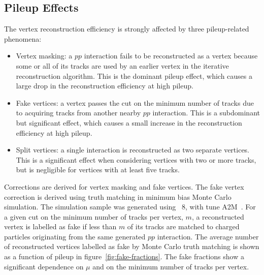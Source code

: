 \subsection{Pileup Effects}\label{sec:luminosity-vertex-pileup}
The vertex reconstruction efficiency is strongly affected by three pileup-related phenomena:

\begin{itemize}
	\item Vertex masking: a $pp$ interaction fails to be reconstructed as a vertex because some or all of its tracks are used by an earlier vertex in the iterative reconstruction algorithm. This is the dominant pileup effect, which causes a large drop in the reconstruction efficiency at high pileup.
	\item Fake vertices: a vertex passes the cut on the minimum number of tracks due to acquiring tracks from another nearby $pp$ interaction. This is a subdominant but significant effect, which causes a small increase in the reconstruction efficiency at high pileup.
	\item Split vertices: a single interaction is reconstructed as two separate vertices. This is a significant effect when considering vertices with two or more tracks, but is negligible for vertices with at least five tracks.
\end{itemize}

Corrections are derived for vertex masking and fake vertices. The fake vertex correction is derived using truth matching in minimum bias Monte Carlo simulation. The simulation sample was generated using \pythia~8, with tune A2M~\cite{pythia8,AUET2}. For a given cut on the minimum number of tracks per vertex, $m$, a reconstructed vertex is labelled as fake if less than $m$ of its tracks are matched to charged particles originating from the same generated $pp$ interaction. The average number of reconstructed vertices labelled as fake by Monte Carlo truth matching is shown as a function of pileup in figure~\ref{fig:fake-fractions}. The fake fractions show a significant dependence on $\mu$ and on the minimum number of tracks per vertex.

